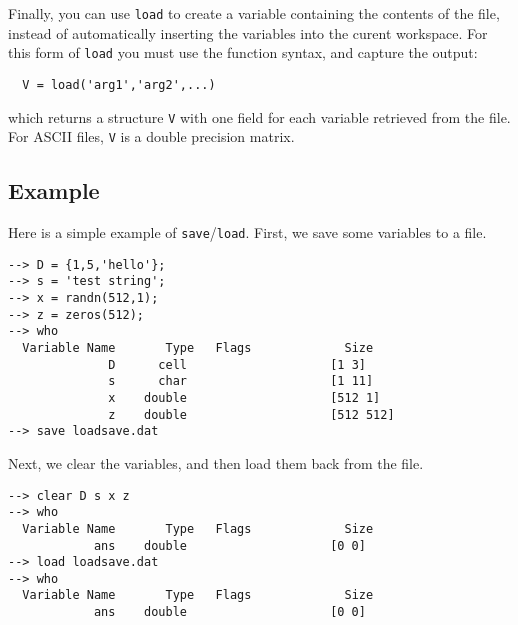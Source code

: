 Finally, you can use \verb|load| to create a variable containing the 
contents of the file, instead of automatically inserting the variables
into the curent workspace.  For this form of \verb|load| you must use the
function syntax, and capture the output:
\begin{verbatim}
  V = load('arg1','arg2',...)
\end{verbatim}
which returns a structure \verb|V| with one field for each variable
retrieved from the file.  For ASCII files, \verb|V| is a double precision
matrix.

\subsection{Example}

Here is a simple example of \verb|save|/\verb|load|.  First, we save some variables to a file.
\begin{verbatim}
--> D = {1,5,'hello'};
--> s = 'test string';
--> x = randn(512,1);
--> z = zeros(512);
--> who
  Variable Name       Type   Flags             Size
              D      cell                    [1 3]
              s      char                    [1 11]
              x    double                    [512 1]
              z    double                    [512 512]
--> save loadsave.dat
\end{verbatim}
Next, we clear the variables, and then load them back from the file.
\begin{verbatim}
--> clear D s x z
--> who
  Variable Name       Type   Flags             Size
            ans    double                    [0 0]
--> load loadsave.dat
--> who
  Variable Name       Type   Flags             Size
            ans    double                    [0 0]
\end{verbatim}
